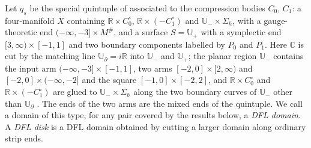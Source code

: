 \documentclass[11pt]{amsart}
\theoremstyle{definition}
\theoremstyle{remark}
\theoremstyle{plain}
\numberwithin{equation}{section}
\newcommand{\RR}{\mathbb{R}}
\newcommand{\CC}{\mathbb{C}}
\begin{document}
Let $q_s$ be the special quintuple of \cite[Section~3.1]{DFL} associated
to the compression bodies $C_0$, $C_1$: a four-manifold $X$ containing
$\RR\times C_0^\circ$, $\RR\times(-C_1^\circ)$ and $\mathbb U_-\times\Sigma_h$,
with a gauge-theoretic end $(-\infty,-3]\times M^\#$, and a surface
$S=\mathbb U_+$ with a symplectic end $[3,\infty)\times[-1,1]$ and two boundary
components labelled by $P_0$ and $P_1$. Here $\CC$ is cut by the matching line
$\mathbb U_\partial=i\RR$ into $\mathbb U_-$ and $\mathbb U_+$; the planar region $\mathbb U_-$ contains the input
arm $(-\infty,-3]\times[-1,1]$, two arms $[-2,0]\times[2,\infty)$ and
$[-2,0]\times(-\infty,-2]$ and the square $[-1,0]\times[-2,2]$, and $\RR\times C_0^\circ$
and $\RR\times(-C_1^\circ)$ are glued to $\mathbb U_-\times\Sigma_h$ along the two boundary
curves of $\mathbb U_-$ other than $\mathbb U_\partial$ \cite[Figure~1]{DFL}. The ends of the two
arms are the mixed ends of the quintuple. We call a domain of this type, for
any pair covered by the results below, a \emph{DFL domain}. A \emph{DFL disk} is a DFL domain obtained by cutting a larger
domain along ordinary strip ends.
\end{document}

